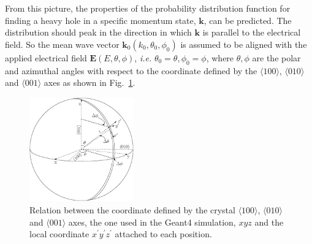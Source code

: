 From this picture, the properties of the probability distribution function for finding a heavy hole in a specific momentum state, $\mathbf{k}$, can be predicted. The distribution should peak in the direction in which $\mathbf{k}$ is parallel to the electrical field. So the mean wave vector $\mathbf{k}_{0}(k_{0}, \theta_{0}, \phi_{0})$ is assumed to be aligned with the applied electrical field $\mathbf{E}(E, \theta, \phi)$, \textit{i.e.} $\theta_{0} = \theta, \phi_{0} = \phi$, where $\theta, \phi$ are the polar and azimuthal angles with respect to the coordinate defined by the $\langle100\rangle$, $\langle010\rangle$ and $\langle001\rangle$ axes as shown in Fig.~\ref{fig:vsphere}.
\begin{figure}[tbhp]
  \centering
  \includegraphics[width=0.4\textwidth]{vsphere}  
  \caption{Relation between the coordinate defined by the crystal
$\langle100\rangle$, $\langle010\rangle$ and $\langle001\rangle$ axes,
the one used in the Geant4 simulation, $xyz$ and the local coordinate
$x^{\prime}y^{\prime}z^{\prime}$ attached to each position.}
  \label{fig:vsphere}
\end{figure}

